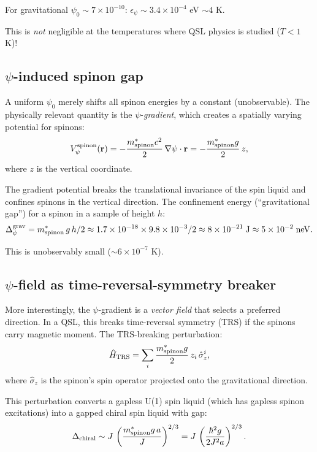 \documentclass[11pt]{article}
\newcommand{\ee}[1]{\times 10^{#1}}
\begin{document}
For gravitational $\psi_0 \sim 7\ee{-10}$: $\epsilon_\psi \sim 3.4\ee{-4}$ eV $\sim 4$ K.

This is \emph{not} negligible at the temperatures where QSL physics is studied ($T < 1$ K)!

\subsection{$\psi$-induced spinon gap}

A uniform $\psi_0$ merely shifts all spinon energies by a constant (unobservable). The physically relevant quantity is the $\psi$-\emph{gradient}, which creates a spatially varying potential for spinons:
\begin{equation}
V_\psi^{\rm spinon}(\mathbf{r}) = -\frac{m_{\rm spinon}^* c^2}{2}\,\nabla\psi\cdot\mathbf{r} = -\frac{m_{\rm spinon}^* g}{2}\,z,
\end{equation}
where $z$ is the vertical coordinate.

The gradient potential breaks the translational invariance of the spin liquid and confines spinons in the vertical direction. The confinement energy (``gravitational gap'') for a spinon in a sample of height $h$:
\begin{equation}
\Delta_\psi^{\rm grav} = m_{\rm spinon}^*\,g\,h / 2 \approx 1.7\ee{-18}\times 9.8\times 10^{-3}/2 \approx 8\ee{-21}\;\text{J} \approx 5\ee{-2}\;\text{neV}.
\end{equation}

This is unobservably small ($\sim 6\ee{-7}$ K).

\subsection{$\psi$-field as time-reversal-symmetry breaker}

More interestingly, the $\psi$-gradient is a \emph{vector field} that selects a preferred direction. In a QSL, this breaks time-reversal symmetry (TRS) if the spinons carry magnetic moment. The TRS-breaking perturbation:
\begin{equation}
\hat{H}_{\rm TRS} = \sum_i \frac{m_{\rm spinon}^* g}{2}\,z_i\,\hat{\sigma}_z^i,
\end{equation}
where $\hat{\sigma}_z$ is the spinon's spin operator projected onto the gravitational direction.

This perturbation converts a gapless U(1) spin liquid (which has gapless spinon excitations) into a gapped chiral spin liquid with gap:
\begin{equation}
\Delta_{\rm chiral} \sim J\,\left(\frac{m_{\rm spinon}^* g\,a}{J}\right)^{2/3} = J\,\left(\frac{\hbar^2 g}{2J^2 a}\right)^{2/3}.
\end{equation}
\end{document}
